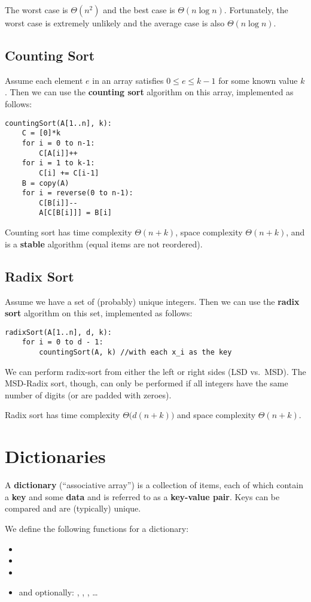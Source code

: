 \documentclass[12pt]{article}
\begin{document}
The worst case is $\Theta(n^2)$ and the best case is $\Theta(n\log n)$. Fortunately, the worst case is extremely unlikely and the average case is also $\Theta(n\log n)$.

\subsection{Counting Sort}
Assume each element $e$ in an array satisfies $0 \leq e \leq k-1$ for some known value $k$. Then we can use the {\bf counting sort} algorithm on this array, implemented as follows:
\begin{verbatim}
countingSort(A[1..n], k):
    C = [0]*k
    for i = 0 to n-1:
        C[A[i]]++
    for i = 1 to k-1:
        C[i] += C[i-1]
    B = copy(A)
    for i = reverse(0 to n-1):
        C[B[i]]--
        A[C[B[i]]] = B[i]
\end{verbatim}

Counting sort has time complexity $\Theta(n+k)$, space complexity $\Theta(n+k)$, and is a {\bf stable} algorithm (equal items are not reordered).

\subsection{Radix Sort}
Assume we have a set of (probably) unique integers.  Then we can use the {\bf radix sort} algorithm on this set, implemented as follows:
\begin{verbatim}
radixSort(A[1..n], d, k):
    for i = 0 to d - 1:
        countingSort(A, k) //with each x_i as the key
\end{verbatim}

We can perform radix-sort from either the left or right sides (LSD vs.\ MSD). The MSD-Radix sort, though, can only be performed if all integers have the same number of digits (or are padded with zeroes).

Radix sort has time complexity $\Theta\bigl(d(n+k)\bigl)$ and space complexity $\Theta(n+k)$.

\section{Dictionaries}
A {\bf dictionary} (``associative array'') is a collection of items, each of which contain a {\bf key} and some {\bf data} and is referred to as a {\bf key-value pair}. Keys can be compared and are (typically) unique.

We define the following functions for a dictionary:
\begin{itemize}
\item {}
\item {}
\item {}
\item and optionally: , , , \dots
\end{itemize}
\end{document}
